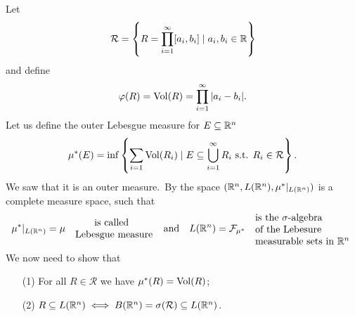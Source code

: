 \documentclass[11pt,a4paper]{article}
\begin{document}
Let
\[
  \mathcal R = \set{R = \prod_{i=1}^{\infty} [a_i,b_i] \mid a_i,b_i \in \mathbb{R}}
\]
and define
\[
  \varphi(R) = \operatorname{Vol}(R) = \prod_{i=1}^{\infty} |a_i - b_i|.
\]
Let us define the outer Lebesgue measure for $E \subseteq \mathbb{R}^n$
\[
  \mu^*(E) = \inf\set{\sum_{i=1} \operatorname{Vol}(R_i) \mid 
  E \subseteq \bigcup_{i=1}^{\infty} R_i \text{ s.t. }R_i \in \mathcal R}.
\]
We saw that it is an outer measure.\
By  the space 
$(\mathbb{R}^n, L(\mathbb{R}^n), \mu^*\vert_{L(\mathbb{R}^n)})$ is a complete measure space,
such that
\[
  \mu^*\vert_{L(\R^n)} = \mu \quad 
  \parbox{8em}{ \phantom{calle}is called \\ Lebesgue measure}
  \tand
  L(\R^n) = \mathcal F_{\mu^*} \quad
  \parbox{10em}{is the $\sigma$-algebra \\ of the Lebesure \\
  measurable sets in $\R^n$}
\]
We now need to show that
\begin{enumerate}
  \item[(1)] For all $R \in \mathcal R$ we have $\mu^*(R) = \operatorname{Vol}(R)$;
  \item[(2)] $R \subseteq L(\mathbb{R}^n) \iff 
    B(\mathbb{R}^n) = \sigma(\mathcal R) \subseteq L(\mathbb{R}^n)$.
\end{enumerate}




\end{document}
